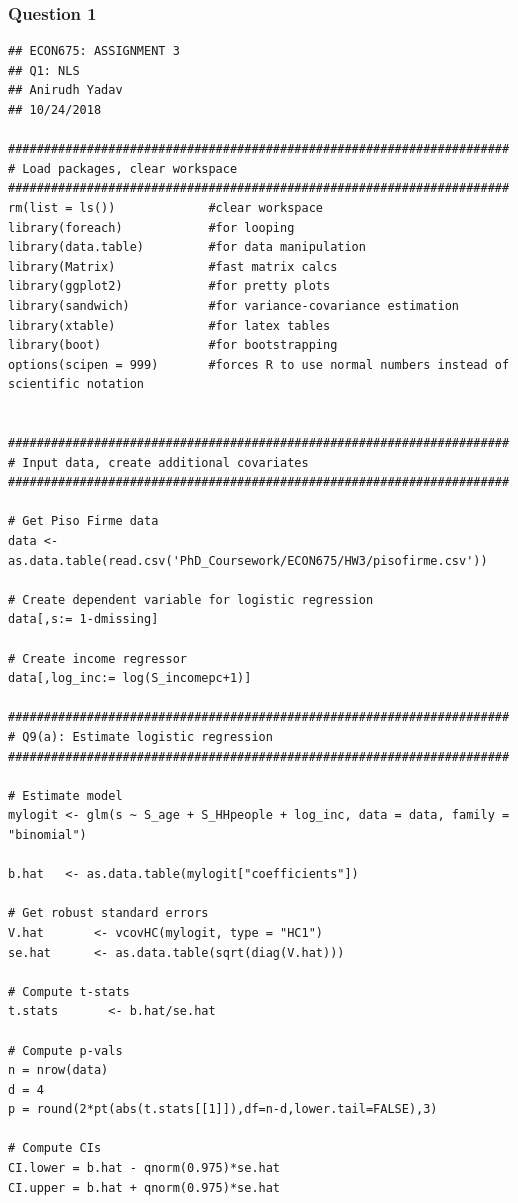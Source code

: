 \documentclass[12pt]{article}
\begin{document}
\subsubsection{Question 1}
\scriptsize
\begin{verbatim}
## ECON675: ASSIGNMENT 3
## Q1: NLS
## Anirudh Yadav 
## 10/24/2018

######################################################################
# Load packages, clear workspace
######################################################################
rm(list = ls())             #clear workspace
library(foreach)            #for looping
library(data.table)         #for data manipulation
library(Matrix)             #fast matrix calcs
library(ggplot2)            #for pretty plots
library(sandwich)           #for variance-covariance estimation 
library(xtable)             #for latex tables
library(boot)               #for bootstrapping
options(scipen = 999)       #forces R to use normal numbers instead of scientific notation


######################################################################
# Input data, create additional covariates
######################################################################

# Get Piso Firme data
data <- as.data.table(read.csv('PhD_Coursework/ECON675/HW3/pisofirme.csv'))

# Create dependent variable for logistic regression
data[,s:= 1-dmissing]

# Create income regressor
data[,log_inc:= log(S_incomepc+1)]

######################################################################
# Q9(a): Estimate logistic regression
######################################################################

# Estimate model
mylogit <- glm(s ~ S_age + S_HHpeople + log_inc, data = data, family = "binomial")

b.hat   <- as.data.table(mylogit["coefficients"])

# Get robust standard errors
V.hat       <- vcovHC(mylogit, type = "HC1")
se.hat      <- as.data.table(sqrt(diag(V.hat)))

# Compute t-stats
t.stats       <- b.hat/se.hat

# Compute p-vals
n = nrow(data)
d = 4
p = round(2*pt(abs(t.stats[[1]]),df=n-d,lower.tail=FALSE),3)

# Compute CIs
CI.lower = b.hat - qnorm(0.975)*se.hat
CI.upper = b.hat + qnorm(0.975)*se.hat


\end{verbatim}
\end{document}
